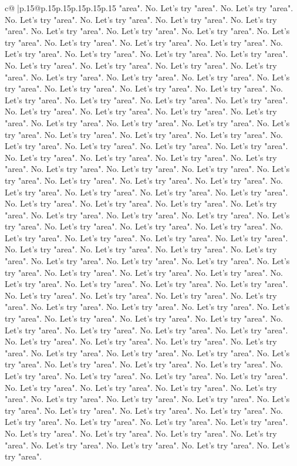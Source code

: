 \documentclass{article}
\begin{document}
{\begin{supertabular}{c@{$\;$}|p{.15\linewidth}@{}p{.15\linewidth}p{.15\linewidth}p{.15\linewidth}p{.15\linewidth}p{.15\linewidth}}
{{{"area". No. Let's try "area". No. Let's try "area". No. Let's try "area". No. Let's try "area". No. Let's try "area". No. Let's try "area". No. Let's try "area". No. Let's try "area". No. Let's try "area". No. Let's try "area". No. Let's try "area". No. Let's try "area". No. Let's try "area". No. Let's try "area". No. Let's try "area". No. Let's try "area". No. Let's try "area". No. Let's try "area". No. Let's try "area". No. Let's try "area". No. Let's try "area". No. Let's try "area". No. Let's try "area". No. Let's try "area". No. Let's try "area". No. Let's try "area". No. Let's try "area". No. Let's try "area". No. Let's try "area". No. Let's try "area". No. Let's try "area". No. Let's try "area". No. Let's try "area". No. Let's try "area". No. Let's try "area". No. Let's try "area". No. Let's try "area". No. Let's try "area". No. Let's try "area". No. Let's try "area". No. Let's try "area". No. Let's try "area". No. Let's try "area". No. Let's try "area". No. Let's try "area". No. Let's try "area". No. Let's try "area". No. Let's try "area". No. Let's try "area". No. Let's try "area". No. Let's try "area". No. Let's try "area". No. Let's try "area". No. Let's try "area". No. Let's try "area". No. Let's try "area". No. Let's try "area". No. Let's try "area". No. Let's try "area". No. Let's try "area". No. Let's try "area". No. Let's try "area". No. Let's try "area". No. Let's try "area". No. Let's try "area". No. Let's try "area". No. Let's try "area". No. Let's try "area". No. Let's try "area". No. Let's try "area". No. Let's try "area". No. Let's try "area". No. Let's try "area". No. Let's try "area". No. Let's try "area". No. Let's try "area". No. Let's try "area". No. Let's try "area". No. Let's try "area". No. Let's try "area". No. Let's try "area". No. Let's try "area". No. Let's try "area". No. Let's try "area". No. Let's try "area". No. Let's try "area". No. Let's try "area". No. Let's try "area". No. Let's try "area". No. Let's try "area". No. Let's try "area". No. Let's try "area". No. Let's try "area". No. Let's try "area". No. Let's try "area". No. Let's try "area". No. Let's try "area". No. Let's try "area". No. Let's try "area". No. Let's try "area". No. Let's try "area". No. Let's try "area". No. Let's try "area". No. Let's try "area". No. Let's try "area". No. Let's try "area". No. Let's try "area". No. Let's try "area". No. Let's try "area". No. Let's try "area". No. Let's try "area". No. Let's try "area". No. Let's try "area". No. Let's try "area". No. Let's try "area". No. Let's try "area". No. Let's try "area". No. Let's try "area". No. Let's try "area". No. Let's try "area". No. Let's try "area". No. Let's try "area". No. Let's try "area". No. Let's try "area". No. Let's try "area". No. Let's try "area". No. Let's try "area". No. Let's try "area". No. Let's try "area". No. Let's try "area". No. Let's try "area". No. Let's try "area". No. Let's try "area". No. Let's try "area". No. Let's try "area". No. Let's try "area". No. Let's try "area". No. Let's try "area". No. Let's try "area". No. Let's try "area". No. Let's try "area". No. Let's try "area". No. Let's try "area". No. Let's try "area". No. Let's try "area". }}}
\end{supertabular}}
\end{document}

